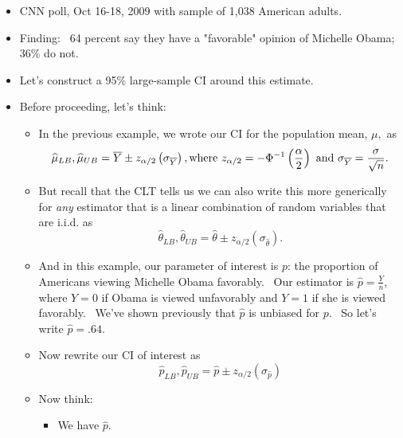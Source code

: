 \documentclass[11pt]{article}
\begin{document}
\begin{itemize}
\item CNN poll, Oct 16-18, 2009 with sample of 1,038 American adults.

\item Finding: \ 64 percent say they have a "favorable" opinion of Michelle
Obama; 36\% do not.\ 

\item Let's construct a 95\% large-sample CI around this estimate.

\item Before proceeding, let's think:

\begin{itemize}
\item In the previous example, we wrote our CI for the population mean, $\mu
,$ as%
\begin{equation*}
\widehat{\mu }_{LB},\widehat{\mu }_{UB}=\overline{Y}\pm z_{\alpha /2}\left(
\sigma _{\overline{Y}}\right) ,\text{where }z_{\alpha /2}=-\Phi ^{-1}\left( 
\frac{\alpha }{2}\right) \text{ and }\sigma _{\overline{Y}}=\frac{\sigma }{%
\sqrt{n}}.
\end{equation*}

\item But recall that the CLT tells us we can also write this more
generically for \textit{any }estimator that is a linear combination of
random variables that are i.i.d. as%
\begin{equation*}
\widehat{\theta }_{LB},\widehat{\theta }_{UB}=\widehat{\theta }\pm z_{\alpha
/2}\left( \sigma _{\widehat{\theta }}\right) .
\end{equation*}

\item And in this example, our parameter of interest is $p$: the proportion
of Americans viewing Michelle Obama favorably. \ Our estimator is $\widehat{p%
}=\frac{Y}{n}$, where $Y=0$ if Obama is viewed unfavorably and $Y=1$ if she
is viewed favorably. \ We've shown previously that $\widehat{p}$ is unbiased
for $p$. \ So let's write $\widehat{p}=.64.$

\item Now rewrite our CI of interest as%
\begin{equation*}
\widehat{p}_{LB},\widehat{p}_{UB}=\widehat{p}\pm z_{\alpha /2}\left( \sigma
_{\widehat{p}}\right)
\end{equation*}

\item Now think:

\begin{itemize}
\item We have $\widehat{p}.$


\end{itemize}
\end{itemize}
\end{itemize}
\end{document}
